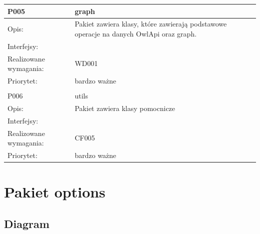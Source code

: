 \documentclass[a4paper,10pt]{article}
\begin{document}
\begin{center}
\begin{longtable}{|m{3cm}|m{9cm}|}
P005 & graph\\ \hline
Opis: & Pakiet zawiera klasy, które zawierają podstawowe operacje na danych OwlApi oraz graph. \\ \hline
Interfejsy: &     \\ \hline
Realizowane wymagania: & WD001 \\ \hline
Priorytet: & bardzo ważne \\ \hline

\multicolumn{2}{c}{} \\
 \hline

P006 & utils\\ \hline
Opis: & Pakiet zawiera klasy pomocnicze \\ \hline
Interfejsy: &     \\ \hline
Realizowane wymagania: & CF005 \\ \hline
Priorytet: & bardzo ważne \\ \hline

\end{longtable}

\end{center}

\section{Pakiet options}

\subsection{Diagram}

\end{document}
